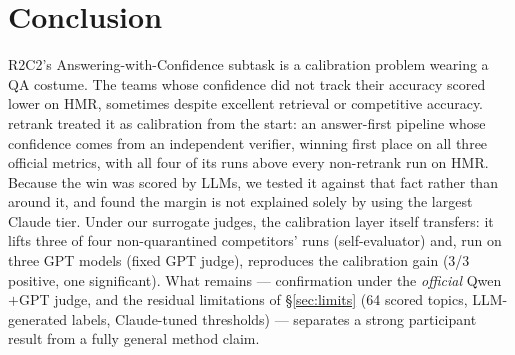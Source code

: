 \documentclass[sigconf,nonacm]{acmart}
\newcommand{\HMR}{\textsc{HMR}}
\begin{document}
\section{Conclusion}
R2C2's Answering-with-Confidence subtask is a calibration problem wearing a QA costume. The
teams whose confidence did not track their accuracy
scored lower on \HMR, sometimes despite excellent retrieval or
competitive accuracy. retrank treated it as calibration from the start: an answer-first
pipeline whose confidence comes from an independent verifier, winning first place on all
three official metrics, with all four of its runs above every non-retrank run on \HMR.
Because the win was scored by LLMs, we tested it against that fact rather than around it, and
found the margin is not explained solely by using the largest Claude tier. Under our
surrogate judges, the calibration layer itself transfers: it lifts three of four
non-quarantined competitors' runs (self-evaluator) and, run on three GPT models (fixed GPT
judge), reproduces the calibration gain (3/3 positive, one significant). What remains --- confirmation under the
\emph{official} Qwen$+$GPT judge, and the residual limitations of \S\ref{sec:limits} (64
scored topics, LLM-generated labels, Claude-tuned thresholds) --- separates a strong
participant result from a fully general method claim.
\end{document}

